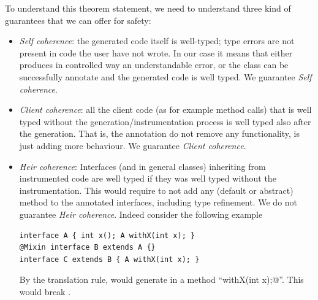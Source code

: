 To understand this theorem statement, we need to understand three kind of guarantees that we can offer for safety:
\begin{itemize}
\item \textit{Self coherence}: the generated code itself is well-typed; type errors are not present in code the user have not wrote.
In our case it means that either \mixin{} produces in controlled way an understandable error, or the class can be successfully annotate and the generated code is well typed.
We guarantee \textit{Self coherence}.

\item \textit{Client coherence}: all the client code (as for example method calls) that is well typed without the generation/instrumentation process is well typed also after the generation.
That is, the annotation do not remove any functionality, is just
adding more behaviour.
We guarantee \textit{Client coherence}.

\item \textit{Heir coherence}: Interfaces (and in general classes) inheriting from instrumented code are well typed if they was well typed without the instrumentation.
This would require to not add any (default or abstract) method to the annotated interfaces, including type refinement.
We do not guarantee \textit{Heir coherence}.
Indeed consider the following example

\begin{lstlisting}
interface A { int x(); A withX(int x); }
@Mixin interface B extends A {}
interface C extends B { A withX(int x); }
\end{lstlisting}
 
By the translation rule, \mixin would  generate in \Q@B@  a method ``\Q@B withX(int x);@''.
This would break \Q@C@.

\end{itemize}


